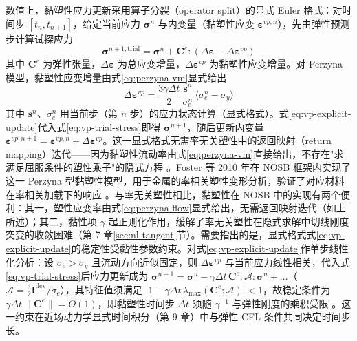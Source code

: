 数值上，黏塑性应力更新采用算子分裂（operator split）的显式 Euler 格式：对时间步 $[t_{n},t_{n+1}]$，给定当前应力 $\boldsymbol{\sigma}^{n}$ 与内变量（黏塑性应变 $\boldsymbol{\varepsilon}^{vp,n}$），先由弹性预测步计算试探应力
\begin{equation}
  \boldsymbol{\sigma}^{n+1,\mathrm{trial}}=\boldsymbol{\sigma}^{n}+\mathbf{C}^{e}:(\Delta\boldsymbol{\varepsilon}-\Delta\boldsymbol{\varepsilon}^{vp})
  \label{eq:vp-trial-stress}
\end{equation}
其中 $\mathbf{C}^{e}$ 为弹性张量，$\Delta\boldsymbol{\varepsilon}$ 为总应变增量，$\Delta\boldsymbol{\varepsilon}^{vp}$ 为黏塑性应变增量。对 Perzyna 模型，黏塑性应变增量由式\eqref{eq:perzyna-vm}显式给出
\begin{equation}
  \Delta\boldsymbol{\varepsilon}^{vp}
  =\frac{3\gamma\Delta t}{2}\,\frac{\mathbf{s}^{n}}{\sigma_{e}^{n}}\,\langle\sigma_{e}^{n}-\sigma_{y}\rangle
  \label{eq:vp-explicit-update}
\end{equation}
其中 $\mathbf{s}^{n}$、$\sigma_{e}^{n}$ 用当前步（第 $n$ 步）的应力状态计算（显式格式）。式\eqref{eq:vp-explicit-update}代入式\eqref{eq:vp-trial-stress}即得 $\boldsymbol{\sigma}^{n+1}$，随后更新内变量 $\boldsymbol{\varepsilon}^{vp,n+1}=\boldsymbol{\varepsilon}^{vp,n}+\Delta\boldsymbol{\varepsilon}^{vp}$。这一显式格式无需率无关塑性中的返回映射（return mapping）迭代——因为黏塑性流动率由式\eqref{eq:perzyna-vm}直接给出，不存在"求满足屈服条件的塑性乘子"的隐式方程 \cite{Foster2010}。Foster 等 2010 年在 NOSB 框架内实现了这一 Perzyna 型黏塑性模型，用于金属的率相关塑性变形分析，验证了对应材料在率相关加载下的响应 \cite{Foster2010}。与率无关塑性相比，黏塑性在 NOSB 中的实现有两个便利：其一，塑性应变率由式\eqref{eq:perzyna-flow}显式给出，无需返回映射迭代（如上所述）；其二，黏性项 $\gamma$ 起正则化作用，缓解了率无关塑性在隐式求解中切线刚度突变的收敛困难（第 7 章\ref{sec:nl-tangent}节）\cite{Foster2010,Hashim2020}。需要指出的是，显式格式式\eqref{eq:vp-explicit-update}的稳定性受黏性参数约束。对式\eqref{eq:vp-explicit-update}作单步线性化分析：设 $\sigma_{e}>\sigma_{y}$ 且流动方向近似固定，则 $\Delta\boldsymbol{\varepsilon}^{vp}$ 与当前应力线性相关，代入式\eqref{eq:vp-trial-stress}后应力更新成为 $\boldsymbol{\sigma}^{n+1}=\boldsymbol{\sigma}^{n}-\gamma\Delta t\,\mathbf{C}^{e}:\boldsymbol{\mathcal{A}}:\boldsymbol{\sigma}^{n}+\ldots$（$\boldsymbol{\mathcal{A}}=\tfrac{3}{2}\mathbf{I}^{\mathrm{dev}}/\sigma_{e}$），其特征值须满足 $|1-\gamma\Delta t\,\lambda_{\max}(\mathbf{C}^{e}:\boldsymbol{\mathcal{A}})|<1$，故稳定条件为 $\gamma\Delta t\,\|\mathbf{C}^{e}\|=O(1)$，即黏塑性时间步 $\Delta t$ 须随 $\gamma^{-1}$ 与弹性刚度的乘积受限 \cite{Foster2010}。这一约束在近场动力学显式时间积分（第 9 章）中与弹性 CFL 条件共同决定时间步长。

